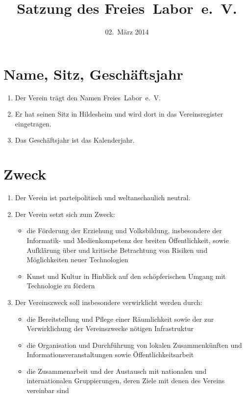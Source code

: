 \documentclass[a4paper,12pt]{scrartcl}
\title{Satzung des Freies~Labor~e.~V.}
\date{02.~März 2014}
\begin{document}
\maketitle


\section{Name, Sitz, Geschäftsjahr}
\begin{enumerate}
  \item Der Verein trägt den Namen Freies~Labor~e.~V.
  \item Er hat seinen Sitz in Hildesheim und wird dort in das Vereinsregister
    eingetragen.
  \item Das Geschäftsjahr ist das Kalenderjahr.
\end{enumerate}

\section{Zweck}
\begin{enumerate}
  \item Der Verein ist parteipolitisch und weltanschaulich neutral.
  \item Der Verein setzt sich zum Zweck:
    \begin{itemize}
      \item
         die Förderung der Erziehung und Volksbildung, insbesondere der
         Informatik- und Medienkompetenz der breiten Öffentlichkeit, sowie
         Aufklärung über und kritische Betrachtung von Risiken und
         Möglichkeiten neuer Technologien
      \item Kunst und Kultur in Hinblick auf den schöpferischen Umgang mit
        Technologie zu fördern
    \end{itemize}
  \item Der Vereinszweck soll insbesondere verwirklicht werden durch:
    \begin{itemize}
      \item die Bereitstellung und Pflege einer Räumlichkeit sowie der zur
        Verwirklichung der Vereinszwecke nötigen Infrastruktur
      \item die Organisation und Durchführung von lokalen Zusammenkünften und
        Informationsveranstaltungen sowie Öffentlichkeitsarbeit
      \item die Zusammenarbeit und der Austausch mit nationalen und
        internationalen Gruppierungen, deren Ziele mit denen des Vereins
        vereinbar sind
    \end{itemize}
\end{enumerate}
\end{document}
